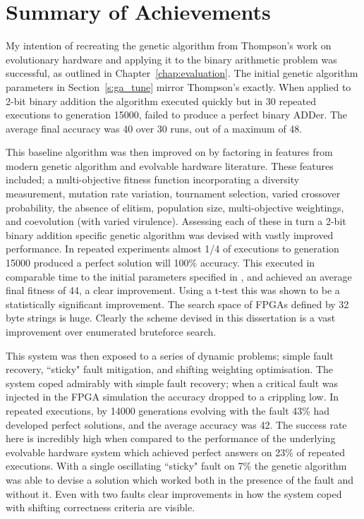 \section{Summary of Achievements}
My intention of recreating the genetic algorithm from Thompson's work on
evolutionary hardware \cite{10.1007/3-540-63173-9_61} and applying it to the
binary arithmetic problem was successful, as outlined in Chapter~\ref{chap:evaluation}.
The initial genetic algorithm parameters in Section~\ref{s:ga_tune} mirror
Thompson's exactly. When applied to 2-bit binary addition the algorithm
executed quickly but in 30 repeated executions to generation 15000, failed to produce a perfect
binary ADDer. The average final accuracy was 40 over 30 runs, out of a maximum of 48.

This baseline algorithm was then improved on by factoring in features from
modern genetic algorithm and evolvable hardware literature.
These features included; a
multi-objective fitness function incorporating a diversity measurement,
mutation rate variation, tournament selection, varied crossover probability,
the absence of elitism, population size, multi-objective weightings, and
coevolution (with varied virulence). Assessing each of these in turn
a 2-bit binary addition specific genetic algorithm was devised with vastly
improved performance. In repeated experiments almost 1/4 of executions to
generation 15000 produced a perfect solution will 100\% accuracy. This
executed in comparable time to the initial parameters specified in
\cite{10.1007/3-540-63173-9_61}, and achieved an average final fitness of 44,
a clear improvement. Using a t-test this was shown to be a statistically significant
improvement.
The search space of FPGAs defined by 32 byte strings is huge. Clearly the
scheme devised in this dissertation is a vast improvement over enumerated bruteforce
search.

This system was then exposed to a series of dynamic problems; simple fault
recovery, ``sticky" fault mitigation, and shifting weighting optimisation.
The system coped admirably with simple fault recovery; when a critical fault
was injected in the FPGA simulation the accuracy dropped to a crippling low.
In repeated executions, by 14000 generations evolving with the fault 43\%
had developed perfect solutions, and the average accuracy was 42. The success
rate here is incredibly high when compared to the performance of the underlying
evolvable hardware system which achieved perfect answers on 23\% of repeated executions.
With a single oscillating ``sticky" fault on 7\% the genetic algorithm was
able to devise a solution which worked both in the presence of the fault and without
it. Even with two faults clear improvements in how the system coped with shifting
correctness criteria are visible.

